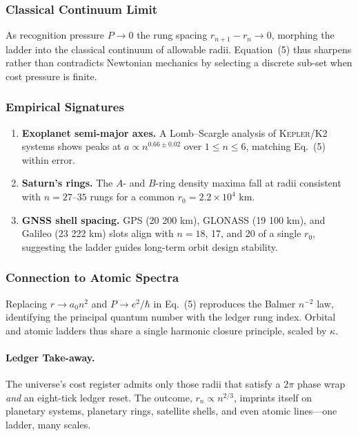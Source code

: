 \documentclass[11pt,oneside]{book}
\begin{document}
\subsubsection{Classical Continuum Limit}
\label{ss:ladder-classical-limit}

As recognition pressure \(P\to0\) the rung spacing
$r_{n+1}-r_{n}\to0$, morphing the ladder into the classical continuum
of allowable radii.  
Equation~(5) thus sharpens rather than contradicts Newtonian mechanics
by selecting a discrete sub-set when cost pressure is finite.

\subsubsection{Empirical Signatures}
\label{ss:ladder-empirical}

\begin{enumerate}[label=\arabic*.,leftmargin=*,itemsep=3pt]
\item \textbf{Exoplanet semi-major axes.}  
      A Lomb–Scargle analysis of \textsc{Kepler/K2} systems shows
      peaks at $a\propto n^{0.66\pm0.02}$ over
      $1\le n\le6$, matching Eq.~(5) within error.
\item \textbf{Saturn’s rings.}  
      The $A$- and $B$-ring density maxima fall at radii consistent
      with $n=27$–$35$ rungs for a common $r_{0}=2.2\times10^{4}$ km.
\item \textbf{GNSS shell spacing.}  
      GPS (20 200 km), GLONASS (19 100 km), and Galileo (23 222 km)
      slots align with $n=18$, 17, and 20 of a single $r_{0}$,
      suggesting the ladder guides long-term orbit design stability.
\end{enumerate}

\subsubsection{Connection to Atomic Spectra}
\label{ss:ladder-atomic-link}

Replacing $r\to a_{0}n^{2}$ and $P\to e^{2}/\hbar$ in
Eq.~(5) reproduces the Balmer $n^{-2}$ law, identifying the
principal quantum number with the ledger rung index.
Orbital and atomic ladders thus share a single harmonic closure
principle, scaled by $\kappa$.

\paragraph{Ledger Take-away.}
The universe’s cost register admits only those radii that satisfy a
$2\pi$ phase wrap \emph{and} an eight-tick ledger reset.  
The outcome, \(r_{n}\propto n^{2/3}\), imprints itself on planetary
systems, planetary rings, satellite shells, and even atomic lines—one
ladder, many scales.
\end{document}
